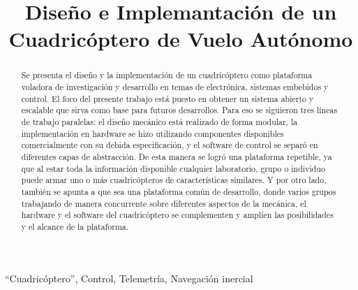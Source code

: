 \documentclass[a4paper, conference]{IEEEtran}
\begin{document}
%
\title{Diseño e Implemantación de un Cuadricóptero de Vuelo Autónomo}


\author{
}



\maketitle


\begin{abstract}
Se presenta el diseño y la implementación de un cuadricóptero como plataforma voladora de investigación y desarrollo en temas de electrónica, sistemas embebidos y control. El foco del presente trabajo está puesto en obtener un sistema abierto y escalable que sirva como base para futuros desarrollos.
Para eso se siguieron tres líneas de trabajo paralelas: el diseño mecánico está realizado de forma modular, la implementación en hardware se hizo utilizando componentes disponibles comercialmente con su debida especificación, y el software de control se separó en diferentes capas de abstracción.
De esta manera se logró una plataforma repetible, ya que al estar toda la información disponible cualquier laboratorio, grupo o individuo puede armar uno o más cuadricópteros de características similares. Y por otro lado, también se apunta a que sea una plataforma común de desarrollo, donde varios grupos trabajando de manera concurrente sobre diferentes aspectos de la mecánica, el hardware y el software del cuadricóptero se complementen y amplíen las posibilidades y el alcance de la plataforma.
\end{abstract}


\begin{IEEEkeywords}
``Cuadricóptero'', Control, Telemetría, Navegación inercial
\end{IEEEkeywords}


\IEEEpeerreviewmaketitle
\end{document}
